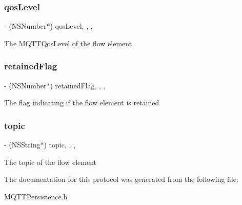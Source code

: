 \subsubsection{\texorpdfstring{qos\+Level}{qosLevel}}
{\footnotesize\ttfamily -\/ (N\+S\+Number$\ast$) qos\+Level\hspace{0.3cm}{\ttfamily [read]}, {\ttfamily [write]}, {\ttfamily [nonatomic]}, {\ttfamily [strong]}}

The M\+Q\+T\+T\+Qos\+Level of the flow element \mbox{\label{protocol_m_q_t_t_flow-p_a923204eafe7a147c22f9cccd0e1e757f}} 
\subsubsection{\texorpdfstring{retained\+Flag}{retainedFlag}}
{\footnotesize\ttfamily -\/ (N\+S\+Number$\ast$) retained\+Flag\hspace{0.3cm}{\ttfamily [read]}, {\ttfamily [write]}, {\ttfamily [nonatomic]}, {\ttfamily [strong]}}

The flag indicating if the flow element is retained \mbox{\label{protocol_m_q_t_t_flow-p_ad218ad5cb39f49c477ab92b1e6d408dc}} 
\subsubsection{\texorpdfstring{topic}{topic}}
{\footnotesize\ttfamily -\/ (N\+S\+String$\ast$) topic\hspace{0.3cm}{\ttfamily [read]}, {\ttfamily [write]}, {\ttfamily [nonatomic]}, {\ttfamily [strong]}}

The topic of the flow element 

The documentation for this protocol was generated from the following file\+:\begin{DoxyCompactItemize}
\item 
M\+Q\+T\+T\+Persistence.\+h\end{DoxyCompactItemize}
